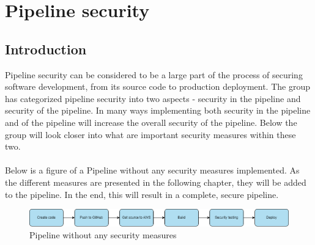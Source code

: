 \chapter{Pipeline security}
\section{Introduction}
Pipeline security can be considered to be a large part of the process of securing software development, from its source code to production deployment. The group has categorized pipeline security into two aspects - security in the pipeline and security of the pipeline. In many ways implementing both security in the pipeline and of the pipeline will increase the overall security of the pipeline. Below the group will look closer into what are important security measures within these two. 
\\~\\
Below is a figure of a \gls{Pipeline} without any security measures implemented. As the different measures are presented in the following chapter, they will be added to the pipeline. In the end, this will result in a complete, secure pipeline.

\vspace{2mm}
\begin{figure}[H]
    \centering
    \includegraphics[width=0.8\columnwidth]{Images/SecurePipeline-Page-3.drawio.png}
    \caption{Pipeline without any security measures}
    \label{fig: Pipeline without any security measures}
\end{figure}




